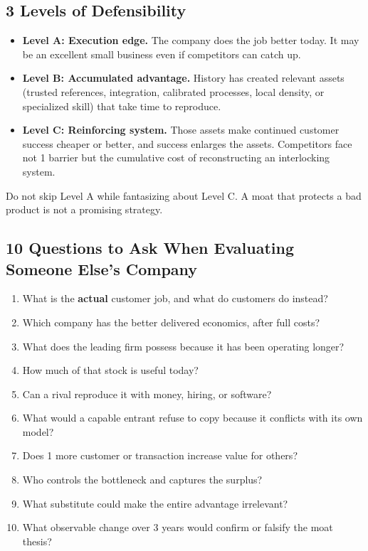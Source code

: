 \subsection{3 Levels of Defensibility}
\label{sec:three_levels_of_defensibility}

\begin{itemize}
    \item \textbf{Level A: Execution edge.} The company does the job better today. It may be an excellent small business even if competitors can catch up.
    \item \textbf{Level B: Accumulated advantage.} History has created relevant assets (trusted references, integration, calibrated processes, local density, or specialized skill) that take time to reproduce.
    \item \textbf{Level C: Reinforcing system.} Those assets make continued customer success cheaper or better, and success enlarges the assets. Competitors face not 1 barrier but the cumulative cost of reconstructing an interlocking system.
\end{itemize}

Do not skip Level A while fantasizing about Level C. A moat that protects a bad product is not a promising strategy.

\subsection{10 Questions to Ask When Evaluating Someone Else's Company}
\label{sec:ten_questions_evaluating_companies}

\begin{enumerate}
    \item What is the \textbf{actual} customer job, and what do customers do instead?
    \item Which company has the better delivered economics, after full costs?
    \item What does the leading firm possess because it has been operating longer?
    \item How much of that stock is useful today?
    \item Can a rival reproduce it with money, hiring, or software?
    \item What would a capable entrant refuse to copy because it conflicts with its own model?
    \item Does 1 more customer or transaction increase value for others?
    \item Who controls the bottleneck and captures the surplus?
    \item What substitute could make the entire advantage irrelevant?
    \item What observable change over 3 years would confirm or falsify the moat thesis?
\end{enumerate}

